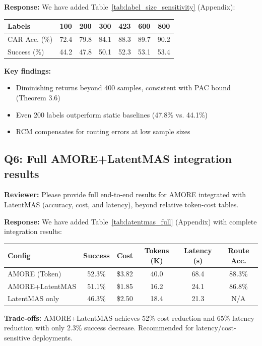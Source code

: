 \documentclass[11pt]{article}
\newcommand{\reviewer}[1]{\textcolor{reviewerblue}{\textbf{Reviewer:} #1}}
\newcommand{\response}[1]{\textcolor{responsegreen}{\textbf{Response:} #1}}
\begin{document}
\response{We have added Table~\ref{tab:label_size_sensitivity} (Appendix):}

\begin{center}
\begin{tabular}{lcccccc}
\toprule
\textbf{Labels} & 100 & 200 & 300 & 423 & 600 & 800 \\
\midrule
CAR Acc. (\%) & 72.4 & 79.8 & 84.1 & 88.3 & 89.7 & 90.2 \\
Success (\%) & 44.2 & 47.8 & 50.1 & 52.3 & 53.1 & 53.4 \\
\bottomrule
\end{tabular}
\end{center}

\textbf{Key findings:}
\begin{itemize}[leftmargin=*,nosep]
    \item Diminishing returns beyond 400 samples, consistent with PAC bound (Theorem 3.6)
    \item Even 200 labels outperform static baselines (47.8\% vs. 44.1\%)
    \item RCM compensates for routing errors at low sample sizes
\end{itemize}

\subsection*{Q6: Full AMORE+LatentMAS integration results}

\reviewer{Please provide full end-to-end results for AMORE integrated with LatentMAS (accuracy, cost, and latency), beyond relative token-cost tables.}

\response{We have added Table~\ref{tab:latentmas_full} (Appendix) with complete integration results:}

\begin{center}
\begin{tabular}{lccccc}
\toprule
\textbf{Config} & \textbf{Success} & \textbf{Cost} & \textbf{Tokens (K)} & \textbf{Latency (s)} & \textbf{Route Acc.} \\
\midrule
AMORE (Token) & 52.3\% & \$3.82 & 40.0 & 68.4 & 88.3\% \\
AMORE+LatentMAS & 51.1\% & \$1.85 & 16.2 & 24.1 & 86.8\% \\
LatentMAS only & 46.3\% & \$2.50 & 18.4 & 21.3 & N/A \\
\bottomrule
\end{tabular}
\end{center}

\textbf{Trade-offs:} AMORE+LatentMAS achieves 52\% cost reduction and 65\% latency reduction with only 2.3\% success decrease. Recommended for latency/cost-sensitive deployments.
\end{document}
